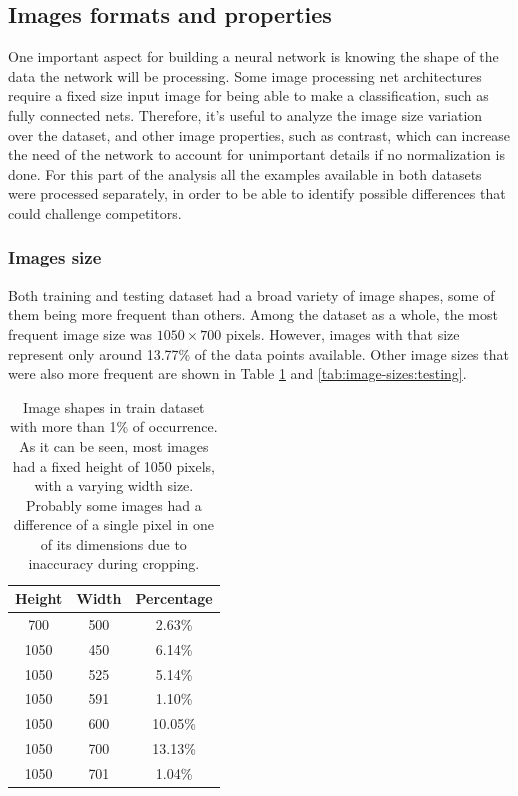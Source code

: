 \documentclass[12pt,
    brazil,			%
	english,        %
	]{article}
\begin{document}
\subsection{Images formats and properties}

One important aspect for building a neural network is knowing the shape of the data the network will be processing. Some image processing net architectures require a fixed size input image for being able to make a classification, such as fully connected nets. Therefore, it's useful to analyze the image size variation over the dataset, and other image properties, such as contrast, which can increase the need of the network to account for unimportant details if no normalization is done. For this part of the analysis all the examples available in both datasets were processed separately, in order to be able to identify possible differences that could challenge competitors.

\subsubsection{Images size}

Both training and testing dataset had a broad variety of image shapes, some of them being more frequent than others. Among the dataset as a whole, the most frequent image size was $1050 \times 700$ pixels. However, images with that size represent only around 13.77\% of the data points available. Other image sizes that were also more frequent are shown in Table \ref{tab:image-sizes:training} and \ref{tab:image-sizes:testing}.

\begin{table}[htb]
    \centering
    \setlength{\tabcolsep}{25pt} %
    \renewcommand{\arraystretch}{1.5} %
    \begin{tabular}{ccc}
        \hline \hline
        Height & Width & Percentage \\
        \hline
        700	&   500 &	2.63\% \\
        1050 &  450 &	6.14\% \\
        1050 &  525 &	5.14\% \\
        1050 &  591 &	1.10\% \\
        1050 &  600 &	10.05\% \\
        1050 &  700 &	13.13\% \\
        1050 &  701 &	1.04\% \\
        \hline \hline
    \end{tabular}
    \caption{Image shapes in train dataset with more than 1\% of occurrence. As it can be seen, most images had a fixed height of 1050 pixels, with a varying width size. Probably some images had a difference of a single pixel in one of its dimensions due to inaccuracy during cropping.}
    \label{tab:image-sizes:training}
\end{table}
\end{document}
